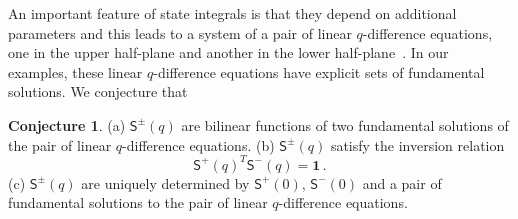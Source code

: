 \documentclass[12pt,reqno]{amsart}
\theoremstyle{definition}
\newtheorem{conjecture}[theorem]{Conjecture}
\def\BZ{\mathbbm Z}
\def\calP{\mathcal P}
\def\s{\sigma}
\def\ri{\mathrm{i}}
\def\re{{\rm e}}
\def\ri{{\rm i}}
\def\sss#1{$\clubsuit\clubsuit$ \textcolor[rgb]{0.0,0.5,0.0}
  {SG: \emph{#1}}$\clubsuit\clubsuit$}
\def\md{\mathbf}
\def\ms{\mathsf}
\begin{document}

An important feature of state integrals is that they depend on
additional parameters and this leads to a system of a pair of linear
$q$-difference equations, one in the upper half-plane and another in
the lower half-plane~\cite{GK:qseries}. In our examples, these linear
$q$-difference equations have explicit sets of fundamental
solutions. We conjecture that

\begin{conjecture}
  \label{conj.1}
  \rm{(a)} $\mathsf{S}^{\pm}(q)$ are bilinear functions of two
  fundamental solutions of the pair of linear $q$-difference
  equations. \newline 
  \rm{(b)} $\mathsf{S}^{\pm}(q)$ satisfy the inversion relation
  \begin{equation}
    \label{Ssym}
    \ms{S}^+(q)^T \ms{S}^-(q) = \md{1} \,.
  \end{equation}
  \rm{(c)} $\mathsf{S}^{\pm}(q)$ are uniquely determined by
  $\mathsf{S}^+(0)$, $\mathsf{S}^-(0)$ and a pair of fundamental
  solutions to the pair of linear $q$-difference equations.
\end{conjecture}
\end{document}
